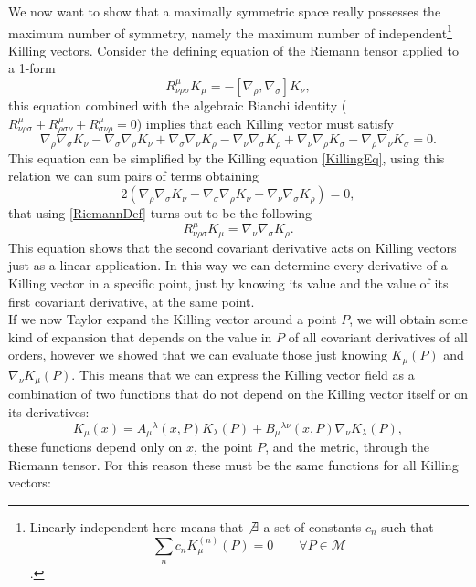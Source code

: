 We now want to show that a maximally symmetric space really possesses the maximum number of symmetry, namely the maximum number of independent\footnote{Linearly independent here means that $\not\exists$ a set of constants $c_n$ such that $$\sum_n c_n K_\mu^{(n)}(P)=0 \qquad \forall P\in\mathcal{M}$$.} Killing vectors.
Consider the defining equation of the Riemann tensor applied to a 1-form
\begin{equation}
    R^{\mu}_{\nu\rho\sigma}K_\mu=-[\nabla_\rho,\nabla_\sigma]K_\nu,\label{RiemannDef}
\end{equation}
this equation combined with the algebraic Bianchi identity ($R^\mu_{\nu\rho\sigma}+R^\mu_{\rho\sigma\nu}+R^\mu_{\sigma\nu\rho}=0 $) implies that each Killing vector must satisfy
$$\nabla_\rho\nabla_\sigma K_\nu-\nabla_\sigma\nabla_\rho K_\nu +\nabla_\sigma\nabla_\nu K_\rho-\nabla_\nu\nabla_\sigma K_\rho+\nabla_\nu\nabla_\rho K_\sigma-\nabla_\rho\nabla_\nu K_\sigma=0.$$
This equation can be simplified by the Killing equation \eqref{KillingEq}, using this relation we can sum pairs of terms obtaining $$ 2(\nabla_\rho\nabla_\sigma K_\nu-\nabla_\sigma\nabla_\rho K_\nu -\nabla_\nu\nabla_\sigma K_\rho)=0,$$ that using \eqref{RiemannDef} turns out to be the following
\begin{equation}
    R^\mu_{\nu\rho\sigma}K_\mu=\nabla_\nu\nabla_\sigma K_\rho. \label{RNabla}
\end{equation}
This equation shows that the second covariant derivative acts on Killing vectors just as a linear application. In this way we can determine every derivative of a Killing vector in a specific point, just by knowing its value and the value of its first covariant derivative, at the same point.\\
If we now Taylor expand the Killing vector around a point $P$, we will obtain some kind of expansion that depends on the value in $P$ of all covariant derivatives of all orders, however we showed that we can evaluate those just knowing $K_\mu(P)$ and $\nabla_\nu K_\mu(P)$. This means that we can express the Killing vector field as a combination of two functions that do not depend on the Killing vector itself or on its derivatives:
\begin{equation*}
    K_\mu(x)=A_\mu\phantom{}^\lambda(x,P)K_\lambda(P)+B_\mu\phantom{}^{\lambda\nu}(x,P)\nabla_\nu K_\lambda(P),
\end{equation*}
these functions depend only on $x$, the point $P$, and the metric, through the Riemann tensor. For this reason these must be the same functions for all Killing vectors:
